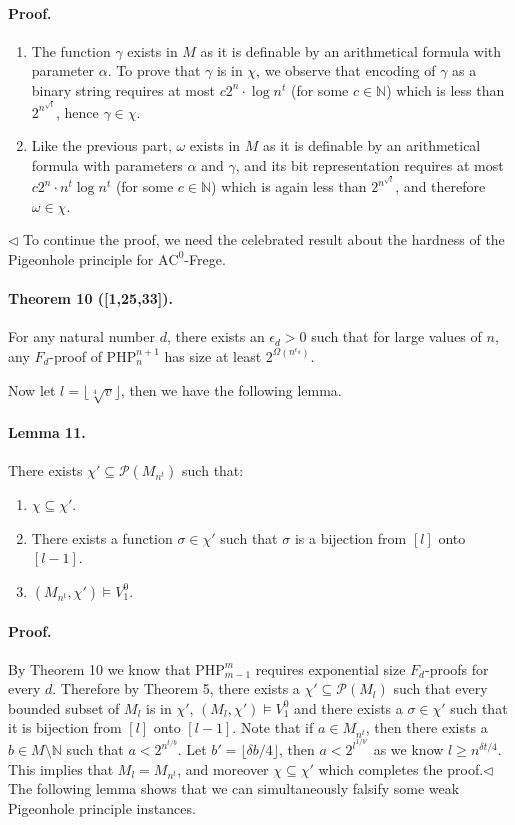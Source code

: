 \paragraph{Proof.}
\begin{enumerate}
\item The function $\gamma$ exists in $M$ as it is definable by an arithmetical formula with parameter $\alpha$. To prove that $\gamma$ is in $\chi$, we observe that encoding of $\gamma$ as a binary string requires at most $c2^n\cdot\log n^t$ (for some $c\in\mathbb N$) which is less than $2^{n^{\sqrt t}}$, hence $\gamma\in\chi$.
\item Like the previous part, $\omega$ exists in $M$ as it is definable by an arithmetical formula with parameters $\alpha$ and $\gamma$, and its bit representation requires at most $c2^n\cdot n^t\log n^t$ (for some $c\in\mathbb N$) which is again less than $2^{n^{\sqrt t}}$, and therefore $\omega\in\chi$.
\end{enumerate}\hfill$\triangleleft$
To continue the proof, we need the celebrated result about the hardness of the Pigeonhole principle for $\mathrm{AC}^0$-Frege.
\paragraph{Theorem 10 ([1,25,33]).} For any natural number $d$, there exists an $\epsilon_d>0$ such that for large values of $n$, any $F_d$-proof of $\mathrm{PHP}_n^{n+1}$ has size at least $2^{\Omega(n^{\epsilon_d})}$.

Now let $l=\lfloor\sqrt[4]v\rfloor$, then we have the following lemma.
\paragraph{Lemma 11.} There exists $\chi'\subseteq\mathcal P(M_{n^t})$ such that:
\begin{enumerate}
\item $\chi\subseteq\chi'$.
\item There exists a function $\sigma\in\chi'$ such that $\sigma$ is a bijection from $[l]$ onto $[l-1]$.
\item $(M_{n^t},\chi')\models V_1^0$.
\end{enumerate}
\paragraph{Proof.} By Theorem 10 we know that $\mathrm{PHP}_{m-1}^m$ requires exponential size $F_d$-proofs for every $d$. Therefore by Theorem 5, there exists a $\chi'\subseteq\mathcal P(M_l)$ such that every bounded subset of $M_l$ is in $\chi'$, $(M_l,\chi')\models V_1^0$ and there exists a $\sigma\in\chi'$ such that it is bijection from $[l]$ onto $[l-1]$.
Note that if $a\in M_{n^t}$, then there exists a $b\in M\setminus\mathbb N$ such that $a<2^{n^{t/b}}$. Let $b'=\lfloor\delta b/4\rfloor$, then $a<2^{l^{1/b'}}$ as we know $l\geq n^{\delta t/4}$. This implies that $M_l=M_{n^t}$, and moreover $\chi\subseteq\chi'$ which completes the proof.\hfill$\triangleleft$
The following lemma shows that we can simultaneously falsify some weak Pigeonhole principle instances.
